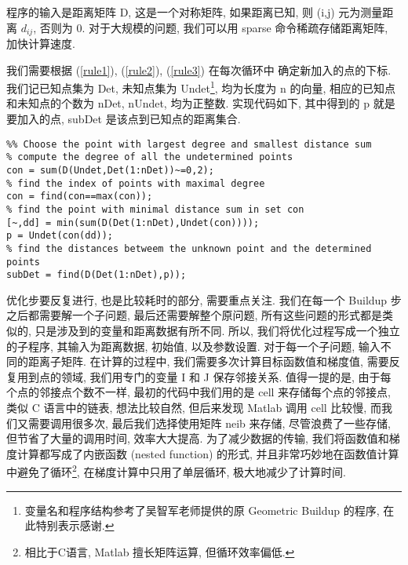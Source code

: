 \documentclass{CASthesis_zzk}
\begin{document}
程序的输入是距离矩阵 D, 这是一个对称矩阵, 
如果距离已知, 则 (i,j) 元为测量距离 $d_{ij}$, 否则为 0.
对于大规模的问题, 我们可以用 sparse 命令稀疏存储距离矩阵, 加快计算速度.

我们需要根据 (\ref{rule1}), (\ref{rule2}), (\ref{rule3}) 在每次循环中
确定新加入的点的下标. 
我们记已知点集为 Det, 未知点集为 Undet\footnote{变量名和程序结构参考了吴智军老师提供的原 Geometric Buildup 的程序, 在此特别表示感谢.}, 均为长度为 n 的向量,
相应的已知点和未知点的个数为 nDet, nUndet, 均为正整数.
实现代码如下, 其中得到的 p 就是要加入的点, 
subDet 是该点到已知点的距离集合.

\vskip3mm
\begin{lstlisting}
%% Choose the point with largest degree and smallest distance sum
% compute the degree of all the undetermined points
con = sum(D(Undet,Det(1:nDet))~=0,2); 
% find the index of points with maximal degree
con = find(con==max(con));  
% find the point with minimal distance sum in set con
[~,dd] = min(sum(D(Det(1:nDet),Undet(con))));
p = Undet(con(dd));  
% find the distances betweem the unknown point and the determined points
subDet = find(D(Det(1:nDet),p)); 
\end{lstlisting}

优化步要反复进行, 也是比较耗时的部分, 需要重点关注.
我们在每一个 Buildup 步之后都需要解一个子问题, 最后还需要解整个原问题,
所有这些问题的形式都是类似的, 只是涉及到的变量和距离数据有所不同.
所以, 我们将优化过程写成一个独立的子程序, 其输入为距离数据, 初始值, 以及参数设置.
对于每一个子问题, 输入不同的距离子矩阵. 
在计算的过程中, 我们需要多次计算目标函数值和梯度值,
需要反复用到点的领域, 我们用专门的变量 I 和 J 保存邻接关系.
值得一提的是, 由于每个点的邻接点个数不一样, 
最初的代码中我们用的是 cell 来存储每个点的邻接点, 类似 C 语言中的链表,
想法比较自然, 但后来发现 Matlab 调用 cell 比较慢, 而我们又需要调用很多次,
最后我们选择使用矩阵 neib 来存储, 尽管浪费了一些存储, 
但节省了大量的调用时间, 效率大大提高.
为了减少数据的传输, 我们将函数值和梯度计算都写成了内嵌函数 (nested function)
的形式, 并且非常巧妙地在函数值计算中避免了循环\footnote{相比于C语言, Matlab 擅长矩阵运算, 但循环效率偏低.},
在梯度计算中只用了单层循环, 极大地减少了计算时间. 
\end{document}

